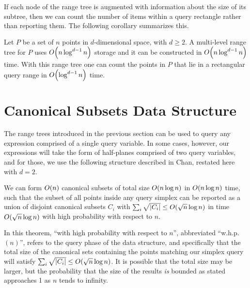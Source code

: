 If each node of the range tree is augmented with information about the size of its subtree, then we can count the number of items within a query rectangle rather than reporting them. The following corollary summarizes this.

\begin{corollary}
\label{cor:rangetree}
Let $P$ be a set of $n$ points in $d$-dimensional space, with $d \geq 2$. A multi-level range tree for $P$ uses $O\!\left(n \log^{d-1}{n}\right)$ storage and it can be constructed in $O\!\left(n \log^{d-1}{n}\right)$ time. With this range tree one can count the points in $P$ that lie in a rectangular query range in $O\!\left(\log^{d-1}{n}\right)$ time.
\end{corollary}


\section{Canonical Subsets Data Structure}
\label{:prelim:chan}

The range trees introduced in the previous section can be used to query any expression comprised of a single query variable.  In some cases, however, our expressions will take the form of half-planes comprised of two query variables, and for those, we use the following structure described in Chan\cite{chan2012}, restated here with $d=2$.

\begin{theorem}
\label{th:chan}
We can form $O\!\left(n\right)$ canonical subsets of total size $O\!\left(n \log{n}\right)$ in $O\!\left(n \log{n}\right)$ time, such that the subset of all points inside any query simplex can be reported as a union of disjoint canonical subsets $C_i$ with $\sum_i{\sqrt{|C_i|}} \leq O\!\left(\sqrt{n}\log{n}\right)$ in time $O\!\left(\sqrt{n}\log{n}\right)$ with high probability with respect to $n$.
\end{theorem}

In this theorem, ``with high probability with respect to $n$'', abbreviated ``w.h.p.~$(n)$'', refers to the query phase of the data structure, and specifically that the total size of the canonical sets containing the points matching our simplex query will satisfy $\sum_i{\sqrt{|C_i|}} \leq O\!\left(\sqrt{n}\log{n}\right)$.
It is possible that the total size may be larger, but the probability that the size of the results \emph{is} bounded as stated approaches 1 as $n$ tends to infinity.

